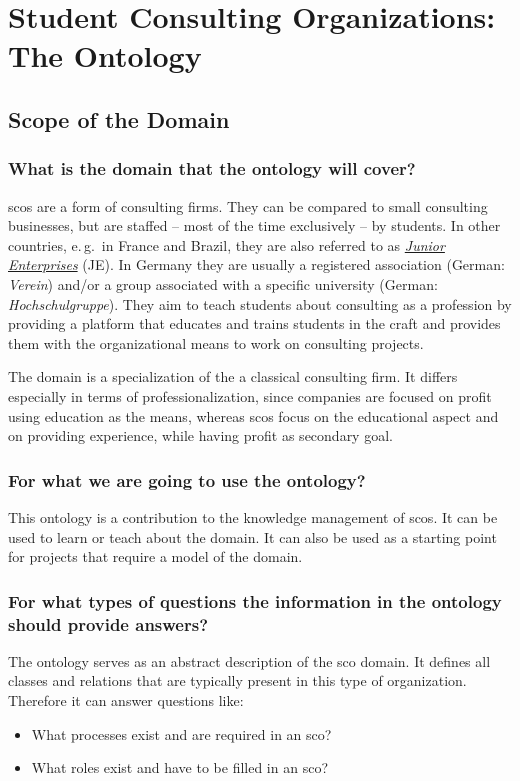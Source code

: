 \documentclass[a4paper, DIV=13, BCOR=0cm]{scrbook}
\newcommand{\eg}{e.\,g.\ }
\begin{document}
\chapter{Student Consulting Organizations: The Ontology }
\section{Scope of the Domain }
\label{competency-questions}
\subsection{What is the domain that the ontology will cover?}
\glspl{sco} are a form of consulting firms.  They can be compared to small consulting businesses, but are staffed -- most of the time exclusively -- by students. In other countries, \eg in France and Brazil, they are also referred to as \href{https://en.wikipedia.org/wiki/Junior_enterprise}{\textit{Junior Enterprises}} (JE). In Germany they are usually a registered association (German: \textit{Verein}) and/or a group associated with a specific university (German: \textit{Hochschulgruppe}). They aim to teach students about consulting as a profession by providing a platform that educates and trains students in the craft and provides them with the organizational means to work on consulting projects.

The domain is a specialization of the a classical consulting firm. It differs especially in terms of professionalization, since companies are focused on profit using education as the means, whereas \glspl{sco} focus on the educational aspect and on providing experience, while having profit as secondary goal.

\subsection{For what we are going to use the ontology?}
This ontology is a contribution to the knowledge management of \glspl{sco}. It can be used to learn or teach about the domain. It can also be used as a starting point for projects that require a model of the domain.

\subsection{For what types of questions the information in the ontology should provide answers?}
The ontology serves as an abstract description of the \gls{sco} domain. It defines all classes and relations that are typically present in this type of organization. Therefore it can answer questions like:
\begin{itemize}
	\item What processes exist and are required in an \gls{sco}?
	\item What roles exist and have to be filled in an \gls{sco}?
\end{itemize}
\end{document}
